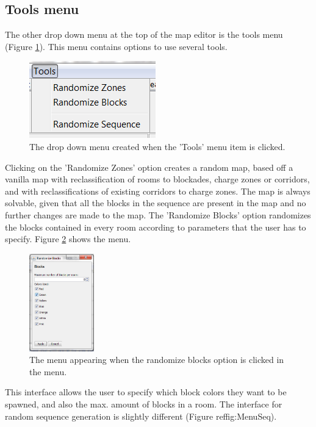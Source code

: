 \subsection{Tools menu}
The other drop down menu at the top of the map editor is the tools menu (Figure \ref{fig:DropDownTools}). This menu contains options to use several tools.

\begin{figure}[h!]
	\center
	\includegraphics{EnvironmentStore/DropDownTools.png}
	\caption{The drop down menu created when the 'Tools' menu item is clicked.}
	\label{fig:DropDownTools}
\end{figure}


Clicking on the 'Randomize Zones' option creates a random map, based off a vanilla map with reclassification of rooms to blockades, charge zones or corridors, and with reclassifications of existing corridors to charge zones. The map is always solvable, given that all the blocks in the sequence are present in the map and no further changes are made to the map. The 'Randomize Blocks' option randomizes the blocks contained in every room according to parameters that the user has to specify. Figure 	\ref{fig:MenuBlocks} shows the menu.

\begin{figure}[h!]
	\center
	\includegraphics[width=0.25\textwidth]{EnvironmentStore/MenuBlocks.png}
	\caption{The menu appearing when the randomize blocks option is clicked in the menu.}
	\label{fig:MenuBlocks}
\end{figure}


This interface allows the user to specify which block colors they want to be spawned, and also the max. amount of blocks in a room. The interface for random sequence generation is slightly different (Figure ref{fig:MenuSeq}).


